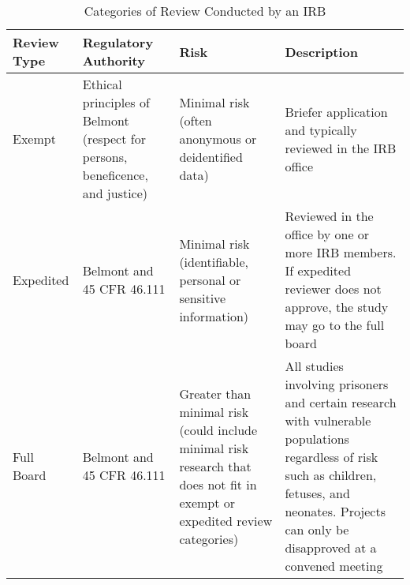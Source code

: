 \begin{table}

\caption{\label{tab:}Categories of Review Conducted by an IRB}
\centering
\begin{tabulary}{1.0\textwidth}{lLLL}
\hline
Review Type & Regulatory Authority & Risk & Description\\
\hline
Exempt & Ethical principles of Belmont (respect for persons, beneficence, and justice) & Minimal risk (often anonymous or deidentified data) & Briefer application and typically reviewed in the IRB office\\
\hline
Expedited & Belmont and 45 CFR 46.111 & Minimal risk (identifiable, personal or sensitive information) & Reviewed in the office by one or more IRB members. If expedited reviewer does not approve, the study may go to the full board\\
\hline
Full Board & Belmont and 45 CFR 46.111 & Greater than minimal risk (could include minimal risk research that does not fit in exempt or expedited review categories) & All studies involving prisoners and certain research with vulnerable populations regardless of risk such as children, fetuses, and neonates. Projects can only be disapproved at a convened meeting\\
\hline
\end{tabulary}
\end{table}